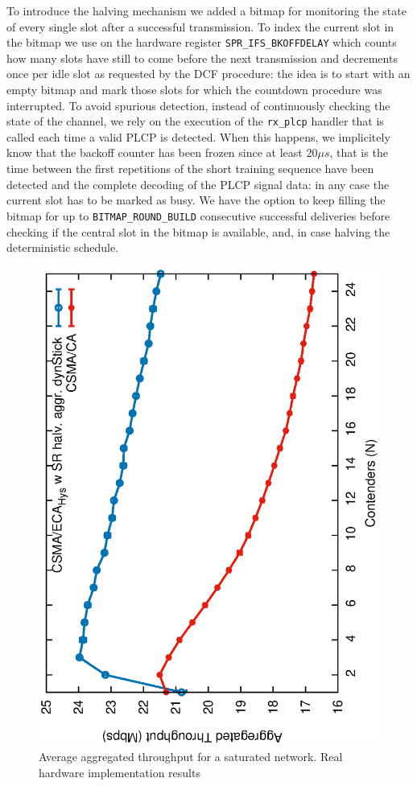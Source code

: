 To introduce the halving mechanism we added a bitmap for monitoring the state of every single slot after a successful transmission. To index the current slot in the bitmap we use on the hardware register {\tt SPR\_IFS\_BKOFFDELAY} which counts how many slots have still to come before the next transmission and decrements once per idle slot as requested by the DCF procedure: the idea is to start with an empty bitmap and mark those slots for which the countdown procedure was interrupted. To avoid spurious detection, instead of continuously checking the state of the channel, we rely on the execution of the {\tt rx\_plcp} handler that is called each time a valid PLCP is detected. When this happens, we implicitely know that the backoff counter has been frozen since at least $20\mu s$, that is the time between the first repetitions of the short training sequence have been detected and the complete decoding of the PLCP signal data: in any case the current slot has to be marked as busy. We have the option to keep filling the bitmap for up to {\tt BITMAP\_ROUND\_BUILD} consecutive successful deliveries before checking if the central slot in the bitmap is available, and, in case halving the deterministic schedule.

	\begin{figure}[tb]
		\centering
		\includegraphics[width=0.7\linewidth,angle=-90]{figures/tonFigs/throughput-sat-SR-IMPLEMENTATION.eps}
		\caption{Average aggregated throughput for a saturated network. Real hardware implementation results}
		\label{fig:throughputImplementation}
	\end{figure}
	
